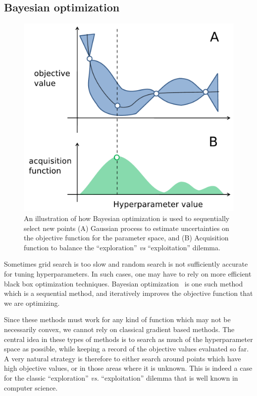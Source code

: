\subsection{Bayesian optimization}


\begin{figure}[htb]
\begin{center}
   \includegraphics[width=0.7\linewidth]{figures/bayes_opt.pdf}
\end{center}
   \caption[Bayesian optimization for parameter tuning]{An illustration of how Bayesian optimization is used to sequentially select new points (A) Gaussian process to estimate uncertainties on the objective function for the parameter space, and (B) Acquisition function to balance the ``exploration'' \emph{vs} ``exploitation'' dilemma.}
   \label{fig:bayes_opt}
\end{figure}

Sometimes grid search is too slow and random search is not sufficiently accurate for tuning hyperparameters. In such cases, one may have to rely on more efficient black box optimization techniques. Bayesian optimization~\citep{snoek2012practical} is one such method which is a sequential method, and iteratively improves the objective function that we are optimizing.

Since these methods must work for any kind of function which may not be necessarily convex, we cannot rely on classical gradient based methods. The central idea in these types of methods is to search as much of the hyperparameter space as possible, while keeping a record of the objective values evaluated so far. A very natural strategy is therefore to either search around points which have high objective values, or in those areas where it is unknown. This is indeed a case for the classic  ``exploration'' \emph{vs.} ``exploitation'' dilemma that is well known in computer science.

